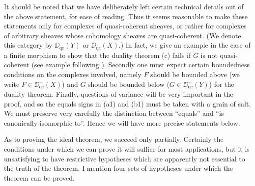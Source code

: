 It should be noted that we have deliberately left certain technical details out of the above statement, for ease of reading. Thus it seems reasonable to make these statements only for complexes of quasi-coherent sheaves, or rather for complexes of arbitrary sheaves whose cohomology sheaves are quasi-coherent. (We denote this category by $\DD_{\mathrm{qc}}(Y)$ or $\DD_{\mathrm{qc}}(X)$.) In fact, we give an example in the case of a finite morphism to show that the duality theorem (c) fails if $G$ is not quasi-coherent (see example following ). Secondly one must expect certain boundedness conditions on the complexes involved, namely $F$ should be bounded above (we write $F\in \DD_{\mathrm{qc}}^{-}(X)$) and $G$ should be bounded below ($G\in \DD_{\mathrm{qc}}^{+}(Y)$) for the duality theorem. Finally, questions of variance will be very important in the proof, and so the equals signs in (a1) and (b1) must be taken with a grain of salt. We must preserve very carefully the distinction between ``equals'' and ``is canonically isomorphic to''. Hence we will have more precise statements below.

As to proving the ideal theorem, we succeed only partially. Certainly the conditions under which we can prove it will suffice for most applications, but it is unsatisfying to have restrictive hypotheses which are apparently not essential to the truth of the theorem. I mention four sets of hypotheses under which the theorem can be proved.

